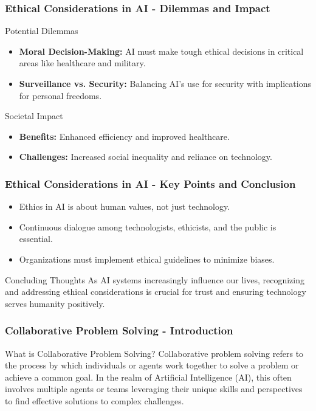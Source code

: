 \documentclass[aspectratio=169]{beamer}
\begin{document}
\begin{frame}[fragile]
    \frametitle{Ethical Considerations in AI - Dilemmas and Impact}
    \begin{block}{Potential Dilemmas}
        \begin{itemize}
            \item \textbf{Moral Decision-Making:} AI must make tough ethical decisions in critical areas like healthcare and military.
            \item \textbf{Surveillance vs. Security:} Balancing AI's use for security with implications for personal freedoms.
        \end{itemize}
    \end{block}

    \begin{block}{Societal Impact}
        \begin{itemize}
            \item \textbf{Benefits:} Enhanced efficiency and improved healthcare.
            \item \textbf{Challenges:} Increased social inequality and reliance on technology.
        \end{itemize}
    \end{block}
\end{frame}

\begin{frame}[fragile]
    \frametitle{Ethical Considerations in AI - Key Points and Conclusion}
    \begin{itemize}
        \item Ethics in AI is about human values, not just technology.
        \item Continuous dialogue among technologists, ethicists, and the public is essential.
        \item Organizations must implement ethical guidelines to minimize biases.
    \end{itemize}

    \begin{block}{Concluding Thoughts}
        As AI systems increasingly influence our lives, recognizing and addressing ethical considerations is crucial for trust and ensuring technology serves humanity positively.
    \end{block}
\end{frame}

\begin{frame}[fragile]
    \frametitle{Collaborative Problem Solving - Introduction}
    \begin{block}{What is Collaborative Problem Solving?}
        Collaborative problem solving refers to the process by which individuals or agents work together to solve a problem or achieve a common goal. In the realm of Artificial Intelligence (AI), this often involves multiple agents or teams leveraging their unique skills and perspectives to find effective solutions to complex challenges.
    \end{block}
\end{frame}
\end{document}
